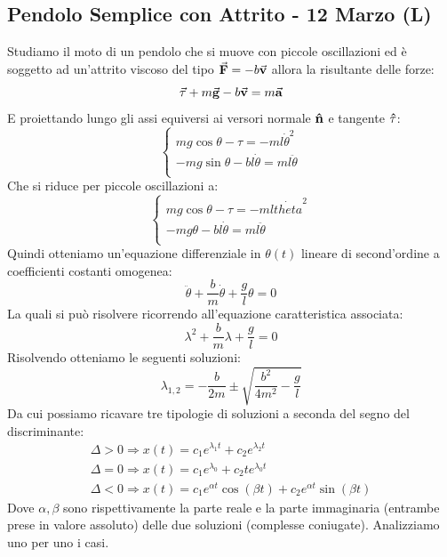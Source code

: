 \documentclass{article}
\newcommand{\then}{\ensuremath{\Rightarrow}}
\renewcommand{\a}{\va{a}}
\renewcommand{\v}{\va{v}}
\newcommand{\tauvs}{\vu{\tau}}
\newcommand{\tauvt}{\va{\tau}}
\newcommand{\normvs}{\vu{n}}
\newcommand{\g}{\va{g}}
\newcommand{\F}{\va{F}}
\begin{document}
\subsection{Pendolo Semplice con Attrito - 12 Marzo (L)}
Studiamo il moto di un pendolo che si muove con piccole oscillazioni ed è soggetto ad un'attrito viscoso del tipo $\F=-b\v$ allora la risultante delle forze:
\[\tauvt+m\g-b\v=m\a\]
E proiettando lungo gli assi equiversi ai versori normale $\normvs$ e tangente $\tauvs$:
\begin{equation}
\left\{
\begin{array}{l}
    mg\cos\theta-\tau=-ml\Dot{\theta}^2  \\
    -mg\sin\theta-bl\Dot{\theta}=ml\ddot{\theta}  \\ 
\end{array}\right.
\end{equation}
Che si riduce per piccole oscillazioni a:
\begin{equation}
\left\{
\begin{array}{l}
    mg\cos\theta-\tau=-ml\Dot{theta}^2  \\
    -mg\theta-bl\Dot{\theta}=ml\ddot{\theta}  \\ 
\end{array}\right.
\end{equation}
Quindi otteniamo un'equazione differenziale in $\theta(t)$ lineare di second'ordine a coefficienti costanti omogenea:
\[\ddot{\theta}+\frac{b}{m}\Dot{\theta}+\frac{g}{l}\theta=0\]
La quali si può risolvere ricorrendo all'equazione caratteristica associata:
\[\lambda^2+\frac{b}{m}\lambda+\frac{g}{l}=0\]
Risolvendo otteniamo le seguenti soluzioni:
\[\lambda_{1,2}=-\frac{b}{2m}\pm\sqrt{\frac{b^2}{4m^2}-\frac{g}{l}}\]
Da cui possiamo ricavare tre tipologie di soluzioni a seconda del segno del discriminante:
\[\begin{array}{l}
     \Delta>0\then x(t)=c_1e^{\lambda_1t}+c_2e^{\lambda_2t}  \\
      \Delta=0\then x(t)=c_1e^{\lambda_0}+c_2te^{\lambda_0t}\\
      \Delta<0\then x(t)=c_1e^{\alpha t}\cos(\beta t)+c_2e^{\alpha t}\sin(\beta t)
\end{array}\]
Dove $\alpha,\beta$ sono rispettivamente la parte reale e la parte immaginaria (entrambe prese in valore assoluto) delle due soluzioni (complesse coniugate).
Analizziamo uno per uno i casi.\\
\end{document}
